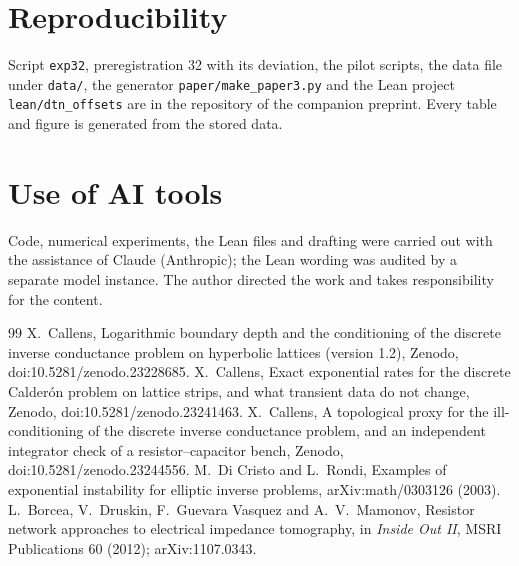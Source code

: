 \documentclass[11pt,a4paper]{article}
\begin{document}
\section*{Reproducibility}
Script \texttt{exp32}, preregistration 32 with its deviation, the pilot scripts, the data file under \texttt{data/}, the generator \texttt{paper/make\_paper3.py} and the Lean project \texttt{lean/dtn\_offsets} are in the repository of the companion preprint. Every table and figure is generated from the stored data.

\section*{Use of AI tools}
Code, numerical experiments, the Lean files and drafting were carried out with the assistance of Claude (Anthropic); the Lean wording was audited by a separate model instance. The author directed the work and takes responsibility for the content.

\begin{thebibliography}{99}
 X.~Callens, Logarithmic boundary depth and the conditioning of the discrete inverse conductance problem on hyperbolic lattices (version 1.2), Zenodo, doi:10.5281/zenodo.23228685.
 X.~Callens, Exact exponential rates for the discrete Calder\'on problem on lattice strips, and what transient data do not change, Zenodo, doi:10.5281/zenodo.23241463.
 X.~Callens, A topological proxy for the ill-conditioning of the discrete inverse conductance problem, and an independent integrator check of a resistor--capacitor bench, Zenodo, doi:10.5281/zenodo.23244556.
 M.~Di Cristo and L.~Rondi, Examples of exponential instability for elliptic inverse problems, arXiv:math/0303126 (2003).
 L.~Borcea, V.~Druskin, F.~Guevara Vasquez and A.~V.~Mamonov, Resistor network approaches to electrical impedance tomography, in \emph{Inside Out II}, MSRI Publications 60 (2012); arXiv:1107.0343.
\end{thebibliography}
\end{document}
